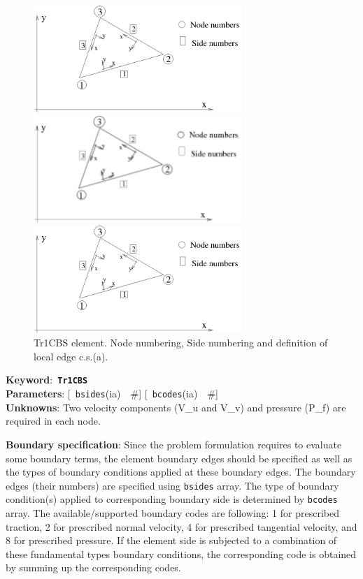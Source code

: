 \documentclass[a4paper]{article}
\newcommand{\descitem}[1]{{\noindent \bf #1}:}
\newcommand{\elemkeyword}[1]{\descitem{Keyword}~{\bf \texttt{#1}}}
\newcommand{\elemparam}[2]{{{\texttt{#1}\tiny (#2)}~~\#}}
\newcommand{\optelemparam}[2]{{[~\elemparam{#1}{#2}]}}
\newcommand{\param}[1]{{\texttt{#1}}}
\begin{document}
\begin{figure}[tb]
\begin{htmlonly}
  \centerline{\includegraphics[width=0.7\textwidth]{trplanstrss.eps}}
\end{htmlonly}
\ifpdf
 \centerline{\includegraphics[width=0.7\textwidth]{trplanstrss.pdf}}
\else
 \centerline{\includegraphics[width=0.7\textwidth]{trplanstrss.eps}}
\fi
\caption{Tr1CBS element. Node numbering, Side numbering and
definition of local edge c.s.(a).}
\label{Tr1CBSfig}
\end{figure}

\elemkeyword{Tr1CBS}\\
\descitem{Parameters} \optelemparam{bsides}{ia} \optelemparam{bcodes}{ia}\\
\descitem{Unknowns}
Two velocity components (V\_u and V\_v) and pressure (P\_f) are required in each node.

\descitem{Boundary specification}
Since the problem formulation requires to evaluate some boundary terms,
the element boundary edges should be specified as well as the types of
boundary conditions applied at these boundary edges. The boundary
edges (their numbers) are specified using \param{bsides} array. The
type of boundary condition(s) applied to corresponding boundary side
is determined by \param{bcodes} array. The available/supported
boundary codes are following: 1 for prescribed traction, 2 for
prescribed normal velocity, 4 for prescribed tangential velocity, and
8 for prescribed pressure. If the element side is subjected to a
combination of these fundamental types boundary conditions, the
corresponding code is obtained by summing up the corresponding codes.
\end{document}
